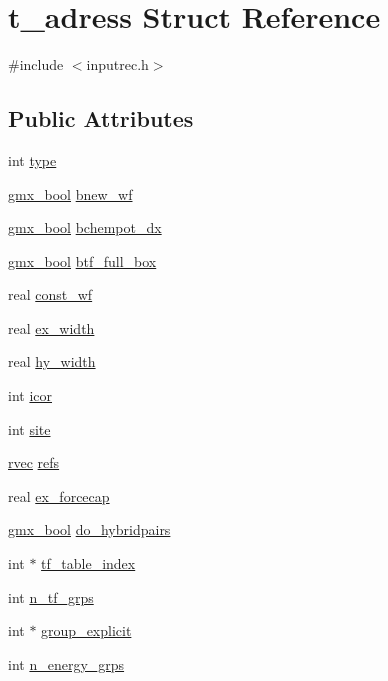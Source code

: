 \hypertarget{structt__adress}{\section{t\-\_\-adress \-Struct \-Reference}
\label{structt__adress}
}


{\ttfamily \#include $<$inputrec.\-h$>$}

\subsection*{\-Public \-Attributes}
\begin{DoxyCompactItemize}
\item 
int \hyperlink{structt__adress_a683fed58045b8feeb14ed9d8243fe1b7}{type}
\item 
\hyperlink{include_2types_2simple_8h_a8fddad319f226e856400d190198d5151}{gmx\-\_\-bool} \hyperlink{structt__adress_ae0e3f0fc54b82d61ced43f8e0a932124}{bnew\-\_\-wf}
\item 
\hyperlink{include_2types_2simple_8h_a8fddad319f226e856400d190198d5151}{gmx\-\_\-bool} \hyperlink{structt__adress_a06568b17d279700c6dac6e02280dffee}{bchempot\-\_\-dx}
\item 
\hyperlink{include_2types_2simple_8h_a8fddad319f226e856400d190198d5151}{gmx\-\_\-bool} \hyperlink{structt__adress_ae6b074960566513edda0ffe7dd468d7d}{btf\-\_\-full\-\_\-box}
\item 
real \hyperlink{structt__adress_afaa5b7a7f39117dc73e0abd5a04eb276}{const\-\_\-wf}
\item 
real \hyperlink{structt__adress_a490cc9848a5e2bf02bb24f11389b1502}{ex\-\_\-width}
\item 
real \hyperlink{structt__adress_a1061fead3aba0c5f75d214fcf8676683}{hy\-\_\-width}
\item 
int \hyperlink{structt__adress_a6e7eb585f209ace67e7e2d9b09c0c551}{icor}
\item 
int \hyperlink{structt__adress_a748c44cf5c5ba16185d5a559a26d4a9c}{site}
\item 
\hyperlink{share_2template_2gromacs_2types_2simple_8h_aa02a552a4abd2f180c282a083dc3a999}{rvec} \hyperlink{structt__adress_a2bf2e2b26a329ff0bbf12c21f41f77d7}{refs}
\item 
real \hyperlink{structt__adress_a0db52a159935b0e7182f8326a19b936b}{ex\-\_\-forcecap}
\item 
\hyperlink{include_2types_2simple_8h_a8fddad319f226e856400d190198d5151}{gmx\-\_\-bool} \hyperlink{structt__adress_a4314a68d343950b11412732365be1184}{do\-\_\-hybridpairs}
\item 
int $\ast$ \hyperlink{structt__adress_a7a0bf65bcb94628c035d6758de5e8e5d}{tf\-\_\-table\-\_\-index}
\item 
int \hyperlink{structt__adress_afd14555f2eb201aa5c6baa0eb8c6549f}{n\-\_\-tf\-\_\-grps}
\item 
int $\ast$ \hyperlink{structt__adress_a6129302604d775f0315002aec15f7c8b}{group\-\_\-explicit}
\item 
int \hyperlink{structt__adress_a08cc01b2f6b7f3be84fedf4549a9d16a}{n\-\_\-energy\-\_\-grps}
\end{DoxyCompactItemize}


